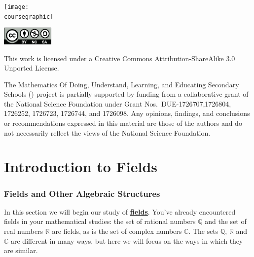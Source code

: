 \documentclass[11pt]{article}
\renewcommand\emph[1]{\underline{\bf{#1}}} %
\theoremstyle{definition}
\begin{document}
\maketitle
\ifthenelse{\equal{\coursegraphic}{}} %
	{}
	{\begin{center}\texttt{[image: \\coursegraphic]}\end{center}}
	
\vfill 
\begin{center} \includegraphics[width=1in]{by-nc-sa.png} \end{center}
\footnotesize{ This work is licensed under a Creative Commons Attribution-ShareAlike 3.0 Unported License. }

\footnotesize{
The Mathematics Of Doing, Understand, Learning, and Educating Secondary Schools (\MODULES) project is partially supported by funding from a collaborative grant of the National Science Foundation under Grant Nos.~DUE-1726707,1726804, 1726252, 1726723, 1726744, and 1726098.  Any opinions, findings, and conclusions or recommendations expressed in this material are those of the authors and do not necessarily reflect the views of the National Science Foundation.}
\newpage
\thispagestyle{plain}   
\listoftodos
\tableofcontents
\newpage {}
\newpage 

\part{Introduction to Fields}

\section{Fields and Other Algebraic Structures}


In this section we will begin our study of \emph{fields}. You've already encountered fields in your mathematical studies: the set of rational numbers $\mathbb{Q}$ 
and the set of real numbers $\mathbb{R}$ are fields, as is the set of complex numbers $\mathbb{C}$. The sets $\mathbb{Q}$, $\mathbb{R}$ and $\mathbb{C}$ are 
different in many ways, but here we will focus on the ways in which they are similar. 
\end{document}
